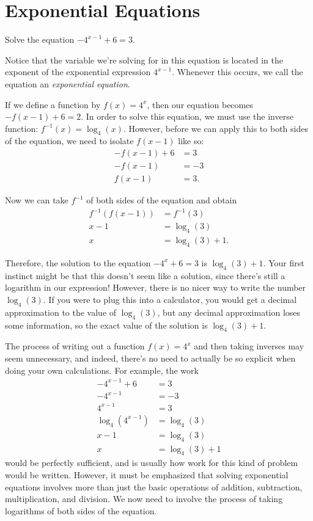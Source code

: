 \documentclass[nooutcomes]{ximera}
\begin{document}
\section{Exponential Equations}
\begin{example}
Solve the equation $-4^{x -1} + 6 = 3$. 
\end{example}
\begin{explanation}
Notice that the variable we're solving for in this equation is located in the exponent of the exponential expression $4^{x - 1}$. Whenever this occurs, we call the equation an \emph{exponential equation}. 

If we define a function by $f(x) = 4^{x}$, then our equation becomes $-f(x - 1) + 6 = 2$. In order to solve this equation, we must use the inverse function: $f^{-1}(x) = \log_4(x)$. However, before we can apply this to both sides of the equation, we need to isolate $f(x - 1)$ like so:
\begin{align*}
-f(x - 1) + 6 & = 3 \\
-f(x - 1) &= -3 \\
f(x - 1) & = 3.
\end{align*}

Now we can take $f^{-1}$ of both sides of the equation and obtain
\begin{align*}
f^{-1}(f(x - 1)) &  = f^{-1}(3) \\
x - 1 & = \log_4(3) \\
x & = \log_4(3) + 1.
\end{align*}

Therefore, the solution to the equation $-4^x + 6 = 3$ is $\log_4(3) + 1$. Your first instinct might be that this doesn't seem like a solution, since there's still a logarithm in our expression! However, there is no nicer way to write the number $\log_4(3)$. If you were to plug this into a calculator, you would get a decimal approximation to the value of $\log_4(3)$, but any decimal approximation loses some information, so the exact value of the solution is $\log_4(3) + 1$. 

The process of writing out a function $f(x) = 4^x$ and then taking inverses may seem unnecessary, and indeed, there's no need to actually be so explicit when doing your own calculations. For example, the work
\begin{align*}
-4^{x - 1} + 6 & = 3 \\
-4^{x - 1} & = -3 \\
4^{x - 1} & = 3 \\
\log_4(4^{x - 1}) & = \log_4(3) \\
x - 1 & = \log_4(3) \\
x & = \log_4(3) + 1
\end{align*}
would be perfectly sufficient, and is usually how work for this kind of problem would be written. However, it must be emphasized that solving exponential equations involves more than just the basic operations of addition, subtraction, multiplication, and division. We now need to involve the process of taking logarithms of both sides of the equation. 

\end{explanation}
\end{document}
